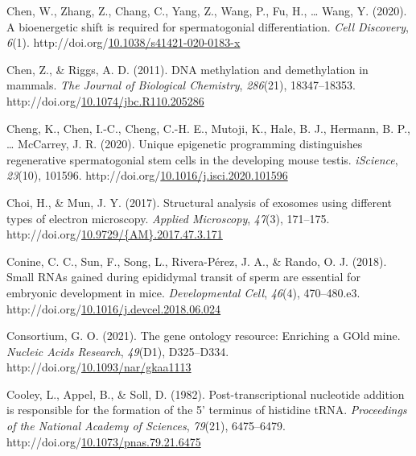 \documentclass[12pt,twoside]{reedthesis}
\newlength{\cslhangindent}
\newenvironment{CSLReferences}[2] %
 {%
  \setlength{\parindent}{0pt}
  \ifodd #1 \everypar{\setlength{\hangindent}{\cslhangindent}}\ignorespaces\fi
  \ifnum #2 > 0
  \setlength{\parskip}{#2\baselineskip}
  \fi
 }%
 {}
\begin{document}
\begin{CSLReferences}{1}{0}
\leavevmode{}%
Chen, W., Zhang, Z., Chang, C., Yang, Z., Wang, P., Fu, H., \ldots{} Wang, Y. (2020). A bioenergetic shift is required for spermatogonial differentiation. \emph{Cell Discovery}, \emph{6}(1). http://doi.org/\href{https://doi.org/10.1038/s41421-020-0183-x}{10.1038/s41421-020-0183-x}

\leavevmode{}%
Chen, Z., \& Riggs, A. D. (2011). DNA methylation and demethylation in mammals. \emph{The Journal of Biological Chemistry}, \emph{286}(21), 18347--18353. http://doi.org/\href{https://doi.org/10.1074/jbc.R110.205286}{10.1074/jbc.R110.205286}

\leavevmode{}%
Cheng, K., Chen, I.-C., Cheng, C.-H. E., Mutoji, K., Hale, B. J., Hermann, B. P., \ldots{} McCarrey, J. R. (2020). Unique epigenetic programming distinguishes regenerative spermatogonial stem cells in the developing mouse testis. \emph{iScience}, \emph{23}(10), 101596. http://doi.org/\href{https://doi.org/10.1016/j.isci.2020.101596}{10.1016/j.isci.2020.101596}

\leavevmode{}%
Choi, H., \& Mun, J. Y. (2017). Structural analysis of exosomes using different types of electron microscopy. \emph{Applied Microscopy}, \emph{47}(3), 171--175. http://doi.org/\href{https://doi.org/10.9729/\%7BAM\%7D.2017.47.3.171}{10.9729/\{AM\}.2017.47.3.171}

\leavevmode{}%
Conine, C. C., Sun, F., Song, L., Rivera-Pérez, J. A., \& Rando, O. J. (2018). Small {RNAs} gained during epididymal transit of sperm are essential for embryonic development in mice. \emph{Developmental Cell}, \emph{46}(4), 470--480.e3. http://doi.org/\href{https://doi.org/10.1016/j.devcel.2018.06.024}{10.1016/j.devcel.2018.06.024}

\leavevmode{}%
Consortium, G. O. (2021). The gene ontology resource: Enriching a GOld mine. \emph{Nucleic Acids Research}, \emph{49}(D1), D325--D334. http://doi.org/\href{https://doi.org/10.1093/nar/gkaa1113}{10.1093/nar/gkaa1113}

\leavevmode{}%
Cooley, L., Appel, B., \& Soll, D. (1982). Post-transcriptional nucleotide addition is responsible for the formation of the 5' terminus of histidine tRNA. \emph{Proceedings of the National Academy of Sciences}, \emph{79}(21), 6475--6479. http://doi.org/\href{https://doi.org/10.1073/pnas.79.21.6475}{10.1073/pnas.79.21.6475}


\end{CSLReferences}
\end{document}
